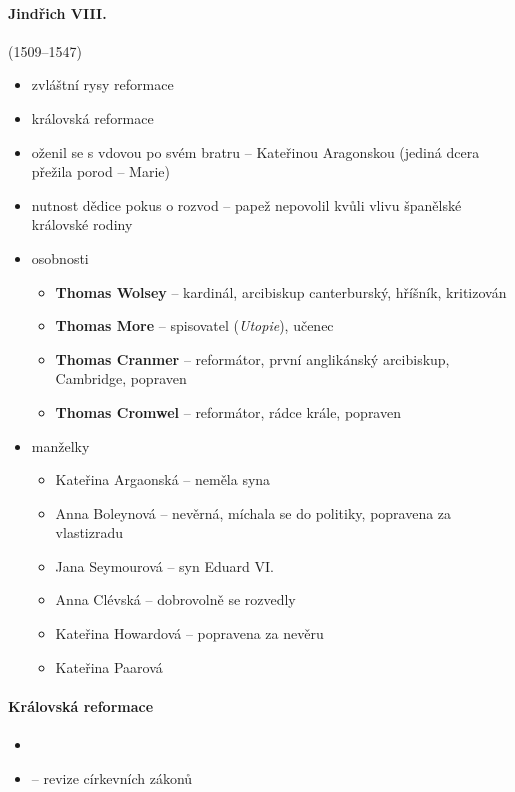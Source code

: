 \paragraph{Jindřich VIII.} (1509--1547)
\begin{itemize}
\item zvláštní rysy reformace
\item královská reformace
\item oženil se s vdovou po svém bratru -- Kateřinou Aragonskou (jediná dcera přežila porod -- Marie)
\item[\ra] nutnost dědice \ra pokus o rozvod -- papež nepovolil kvůli vlivu španělské královské rodiny 
\item osobnosti
	\begin{itemize}
	\item \textbf{Thomas Wolsey} -- kardinál, arcibiskup canterburský, hříšník, kritizován
	\item \textbf{Thomas More} -- spisovatel (\textit{Utopie}), učenec 
	\item \textbf{Thomas Cranmer} -- reformátor, první anglikánský arcibiskup, Cambridge, popraven
	\item \textbf{Thomas Cromwel} -- reformátor, rádce krále, popraven
	\end{itemize}
\item manželky
	\begin{itemize}
	\item Kateřina Argaonská -- neměla syna
	\item Anna Boleynová -- nevěrná, míchala se do politiky, popravena za vlastizradu
	\item Jana Seymourová -- syn Eduard VI.
	\item Anna Clévská -- dobrovolně se rozvedly
	\item Kateřina Howardová -- popravena za nevěru
	\item Kateřina Paarová 
	\end{itemize}
\end{itemize}

\paragraph{Královská reformace}
\begin{itemize}
\item {}
\item {} -- revize církevních zákonů
\end{itemize}

